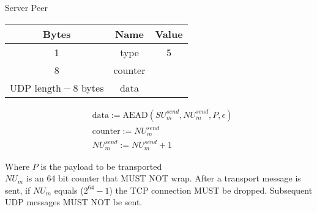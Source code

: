 \begin{center}
    Server \textrightarrow Peer\\
    \begin{tabular}{|c|c|c|}
        \hline
        \textbf{Bytes}                & \textbf{Name} & \textbf{Value} \\
        \hline
        1                             & type          & 5              \\
        \hline
        8                             & counter       &                \\
        \hline
        $\text{UDP length} - 8$ bytes & data          &                \\
        \hline
    \end{tabular}
\end{center}


\begin{align*}
    & \text{data} := \text{AEAD}(\mathit{SU}_{m}^{send}, \mathit{NU}_{m}^{send}, P, \epsilon)\\
    & \text{counter} := \mathit{NU}_{m}^{send}\\
    & \mathit{NU}_{m}^{send} := \mathit{NU}_{m}^{send} + 1
\end{align*}


Where $P$ is the payload to be transported\\

$\mathit{NU}_{m}$ is an 64 bit counter that MUST NOT wrap. After a transport message is sent, if $\mathit{NU}_{m}$ equals
($2^{64}-1$) the TCP connection MUST be dropped. Subsequent UDP messages MUST NOT be sent. \\

